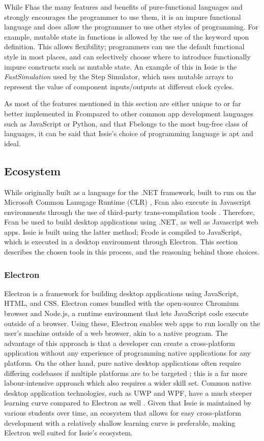 While F\fsharp has the many features and benefits of pure-functional languages and strongly encourages the programmer to use them, it is an impure functional language and does allow the programmer to use other styles of programming. For example, mutable state in functions is allowed by the use of the  keyword upon definition. This allows flexibility; programmers can use the default functional style in most places, and can selectively choose where to introduce functionally impure constructs such as mutable state. An example of this in Issie is the \textit{FastSimulation} used by the Step Simulator, which uses mutable arrays to represent the value of component inputs/outputs at different clock cycles.

As most of the features mentioned in this section are either unique to or far better implemented in F\fsharp compared to other common app development languages such as JavaScript or Python, and that F\fsharp belongs to the most bug-free class of languages, it can be said that Issie's choice of programming language is apt and ideal.

\subsection{Ecosystem} \label{subsec:ecosystem}
While originally built as a language for the .NET framework, built to run on the Microsoft Common Lanugage Runtime (CLR) \cite{clr_mag}, F\fsharp can also execute in Javascript environments through the use of third-party trans-compilation tools \cite{fableio}. Therefore, F\fsharp can be used to build desktop applications using .NET, as well as Javascript web apps. Issie is built using the latter method; F\fsharp code is compiled to JavaScript, which is executed in a desktop environment through Electron. This section describes the chosen tools in this process, and the reasoning behind those choices.

\subsubsection{Electron}
Electron \cite{electrondocs} is a framework for building desktop applications using JavaScript, HTML, and CSS. Electron comes bundled with the open-source Chromium browser and Node.js, a runtime environment that lets JavaScript code execute outside of a browser. Using these, Electron enables web apps to run locally on the user's machine outside of a web browser, akin to a native program. The advantage of this approach is that a developer can create a cross-platform application without any experience of programming native applications for any platform. On the other hand, pure native desktop applications often require differing codebases if multiple platforms are to be targeted \cite{webapps}; this is a far more labour-intensive approach which also requires a wider skill set. Common native desktop application technologies, such as UWP and WPF, have a much steeper learning curve compared to Electron as well \cite{mustdecisions}. Given that Issie is maintained by various students over time, an ecosystem that allows for easy cross-platform development with a relatively shallow learning curve is preferable, making Electron well suited for Issie's ecosystem.

